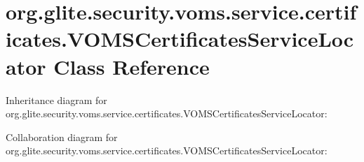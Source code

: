 \hypertarget{classorg_1_1glite_1_1security_1_1voms_1_1service_1_1certificates_1_1VOMSCertificatesServiceLocator}{
\section{org.glite.security.voms.service.certificates.VOMSCertificatesServiceLocator Class Reference}
\label{classorg_1_1glite_1_1security_1_1voms_1_1service_1_1certificates_1_1VOMSCertificatesServiceLocator}
}


Inheritance diagram for org.glite.security.voms.service.certificates.VOMSCertificatesServiceLocator:


Collaboration diagram for org.glite.security.voms.service.certificates.VOMSCertificatesServiceLocator:
